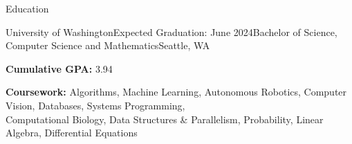 \documentclass{resume} %
\begin{document}
\vspace{-0.6em} %


\begin{rSection}{Education}

\begin{education}{University of Washington}{Expected Graduation: June 2024}{Bachelor of Science, Computer Science and Mathematics}{Seattle, WA}
\item \textbf{Cumulative GPA:} 3.94
\item \textbf{Coursework:} Algorithms, Machine Learning, Autonomous Robotics, Computer Vision, Databases, Systems Programming, \\ Computational Biology, Data Structures \& Parallelism, Probability, Linear Algebra, Differential Equations
\end{education}

\end{rSection}

\end{document}
